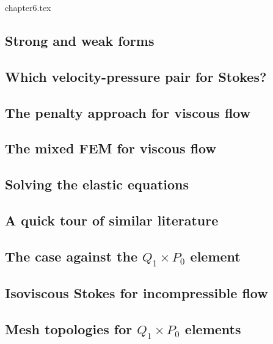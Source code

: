 \begin{flushright} {\tiny {\color{gray} chapter6.tex}} \end{flushright}

\subsection{Strong and weak forms}  %
\subsection{Which velocity-pressure pair for Stokes?}\label{ss:pair} %
\subsection{The penalty approach for viscous flow}\label{sec:penalty} %
\subsection{The mixed FEM for viscous flow} \label{sec:mixed}  %
\subsection{Solving the elastic equations}  %
\subsection{A quick tour of similar literature}  %
\subsection{The case against the $Q_1\times P_0$ element}  %
\subsection{Isoviscous Stokes for incompressible flow}\label{ss:isovisc} 
\subsection{Mesh topologies for $Q_1\times P_0$ elements} \label{ss:meshtopos}  %
